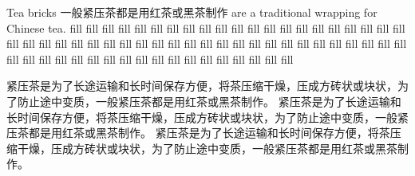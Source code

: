 \documentclass{article}
\newcommand{\cn}{\mktsFontfileSunexta\cjkgUseCjkGlue}
\begin{document}
\begin{multicols}{3}%
{\cn Tea bricks 一般紧压茶都是用红茶或黑茶制作 are a traditional wrapping for Chinese tea.
fill fill fill fill fill fill fill fill fill fill fill fill fill fill fill fill
fill fill fill fill fill fill fill fill fill fill fill fill fill fill fill fill
fill fill fill fill fill fill fill fill fill fill fill fill fill fill fill fill
fill fill fill fill fill fill fill fill fill fill fill fill fill fill fill fill}
\end{multicols}


\begin{multicols}{3}%

{\cn{}紧压茶是为了长途运输和长时间保存方便，将茶压缩干燥，压成方砖状或块状，为了防止途中变质，一般紧压茶都是用红茶或黑茶制作。}%
{\cn{}紧压茶是为了长途运输和长时间保存方便，将茶压缩干燥，压成方砖状或块状，为了防止途中变质，一般紧压茶都是用红茶或黑茶制作。}%
{\cn{}紧压茶是为了长途运输和长时间保存方便，将茶压缩干燥，压成方砖状或块状，为了防止途中变质，一般紧压茶都是用红茶或黑茶制作。}

\end{multicols}
\end{document}
